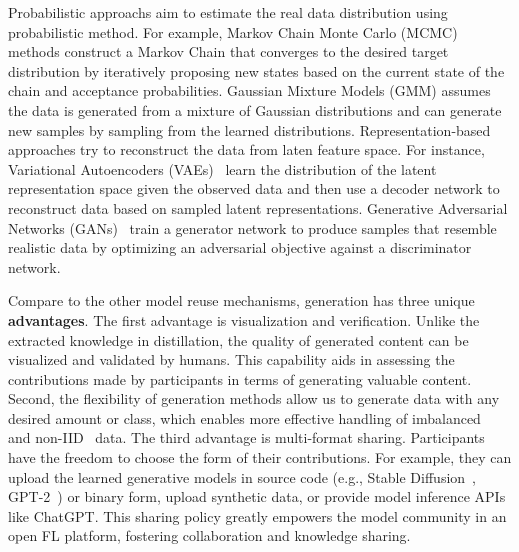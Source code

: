 Probabilistic approachs aim to estimate the real data distribution using probabilistic method.
For example, Markov Chain Monte Carlo (MCMC)~\cite{geyer1992practical} methods construct a Markov Chain that converges to the desired target distribution by iteratively proposing new states based on the current state of the chain and acceptance probabilities.
Gaussian Mixture Models (GMM) assumes the data is generated from a mixture of Gaussian distributions and can generate new samples by sampling from the learned distributions.
Representation-based approaches try to reconstruct the data from laten feature space.
For instance, Variational Autoencoders (VAEs)~\cite{kingma2014auto} learn the distribution of the latent representation space given the observed data and then use a decoder network to reconstruct data based on sampled latent representations.
Generative Adversarial Networks (GANs)~\cite{goodfellow2020generative} train a generator network to produce samples that resemble realistic data by optimizing an adversarial objective against a discriminator network.

Compare to the other model reuse mechanisms, generation has three unique \textbf{advantages}.
The first advantage is visualization and verification. Unlike the extracted knowledge in distillation, the quality of generated content can be visualized and validated by humans. 
This capability aids in assessing the contributions made by participants in terms of generating valuable content.
Second, the flexibility of generation methods allow us to generate data with any desired amount or class, which enables more effective handling of imbalanced~\cite{chawla2002smote} and non-IID~\cite{zhang2022fine} data.
The third advantage is multi-format sharing. Participants have the freedom to choose the form of their contributions. For example, they can upload the learned generative models in source code (e.g., Stable Diffusion~\cite{rombach2022high}, GPT-2~\cite{radford2019language}) or binary form, upload synthetic data, or provide model inference APIs like ChatGPT.
This sharing policy greatly empowers the model community in an open FL platform, fostering collaboration and knowledge sharing.

